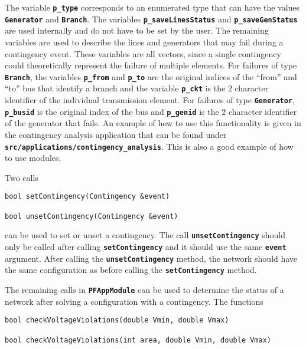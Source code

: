 The variable \texttt{\textbf{p\_type}} corresponds to an enumerated type that can have the values \texttt{\textbf{Generator}} and \texttt{\textbf{Branch}}. The variables \texttt{\textbf{p\_saveLinesStatus}} and \texttt{\textbf{p\_saveGenStatus}} are used internally and do not have to be set by the user. The remaining variables are used to describe the lines and generators that may fail during a contingency event. These variables are all vectors, since a single contingency could theoretically represent the failure of multiple elements. For failures of type \texttt{\textbf{Branch}}, the variables \texttt{\textbf{p\_from}} and \texttt{\textbf{p\_to}} are the original indices of the ``from'' and ``to'' bus that identify a branch and the variable \texttt{\textbf{p\_ckt}} is the 2 character identifier of the individual transmission element. For failures of type \texttt{\textbf{Generator}}, \texttt{\textbf{p\_busid}} is the original index of the bus and \texttt{\textbf{p\_genid}} is the 2 character identifier of the generator that fails. An example of how to use this functionality is given in the contingency analysis application that can be found under \texttt{\textbf{src/applications/contingency\_analysis}}. This is also a good example of how to use modules.

Two calls

{
\color{red}
\begin{Verbatim}[fontseries=b]
bool setContingency(Contingency &event)

bool unsetContingency(Contingency &event)
\end{Verbatim}
}

can be used to set or unset a contingency. The call \texttt{\textbf{unsetContingency}} should only be called after calling \texttt{\textbf{setContingency}} and it should use the same \texttt{\textbf{event}} argument. After calling the \texttt{\textbf{unsetContingency}} method, the network should have the same configuration as before calling the \texttt{\textbf{setContingency}} method.

The remaining calls in \texttt{\textbf{PFAppModule}} can be used to determine the status of a network after solving a configuration with a contingency. The functions

{
\color{red}
\begin{Verbatim}[fontseries=b]
bool checkVoltageViolations(double Vmin, double Vmax)

bool checkVoltageViolations(int area, double Vmin, double Vmax)
\end{Verbatim}
}

